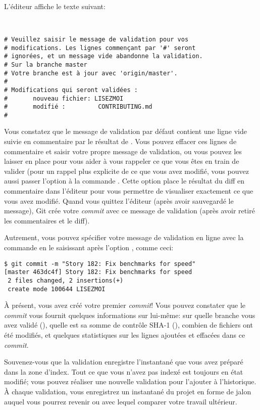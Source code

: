 L'éditeur affiche le texte suivant:
\begin{Schunk}
\begin{Verbatim}


# Veuillez saisir le message de validation pour vos
# modifications. Les lignes commençant par '#' seront
# ignorées, et un message vide abandonne la validation.
# Sur la branche master
# Votre branche est à jour avec 'origin/master'.
#
# Modifications qui seront validées :
#       nouveau fichier: LISEZMOI
#       modifié :         CONTRIBUTING.md
#
\end{Verbatim}
\end{Schunk}

Vous constatez que le message de validation par défaut contient une ligne vide suivie en commentaire par le résultat de .
Vous pouvez effacer ces lignes de commentaire et saisir votre propre message de validation, ou vous pouvez les laisser en place pour vous aider à vous rappeler ce que vous êtes en train de valider (pour un rappel plus explicite de ce que vous avez modifié, vous pouvez aussi passer l'option  à la commande .
Cette option place le résultat du diff en commentaire dans l'éditeur pour vous permettre de visualiser exactement ce que vous avez modifié.
Quand vous quittez l'éditeur (après avoir sauvegardé le message), Git crée votre \emph{commit} avec ce message de validation (après avoir retiré les commentaires et le diff).

Autrement, vous pouvez spécifier votre message de validation en ligne avec la commande  en le saisissant après l'option , comme ceci:
\begin{Schunk}
\begin{Verbatim}
$ git commit -m "Story 182: Fix benchmarks for speed"
[master 463dc4f] Story 182: Fix benchmarks for speed
 2 files changed, 2 insertions(+)
 create mode 100644 LISEZMOI
\end{Verbatim}
\end{Schunk}

À présent, vous avez créé votre premier \emph{commit}! Vous pouvez constater que le \emph{commit} vous fournit quelques informations sur lui-même: sur quelle branche vous avez validé (), quelle est sa somme de contrôle SHA-1 (), combien de fichiers ont été modifiés, et quelques statistiques sur les lignes ajoutées et effacées dans ce \emph{commit}.

Souvenez-vous que la validation enregistre l'instantané que vous avez préparé dans la zone d'index.
Tout ce que vous n'avez pas indexé est toujours en état modifié; vous pouvez réaliser une nouvelle validation pour l'ajouter à l'historique.
À chaque validation, vous enregistrez un instantané du projet en forme de jalon auquel vous pourrez revenir ou avec lequel comparer votre travail ultérieur.

